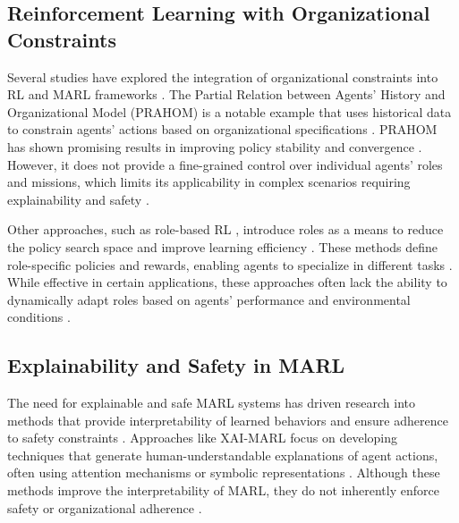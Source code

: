 \documentclass[sigconf,anonymous]{aamas}
\begin{document}
\subsection{Reinforcement Learning with Organizational Constraints}
Several studies have explored the integration of organizational constraints into RL and MARL frameworks \cite{hernandez2019survey}. The Partial Relation between Agents' History and Organizational Model (PRAHOM) \cite{prahom_reference} is a notable example that uses historical data to constrain agents' actions based on organizational specifications \cite{hubner2010moise}. PRAHOM has shown promising results in improving policy stability and convergence \cite{hernandez2019survey}. However, it does not provide a fine-grained control over individual agents' roles and missions, which limits its applicability in complex scenarios requiring explainability and safety \cite{ghosal2021explainable}.


Other approaches, such as role-based RL \cite{role_based_rl_reference}, introduce roles as a means to reduce the policy search space and improve learning efficiency \cite{foerster2018counterfactual}. These methods define role-specific policies and rewards, enabling agents to specialize in different tasks \cite{hernandez2019survey}. While effective in certain applications, these approaches often lack the ability to dynamically adapt roles based on agents' performance and environmental conditions \cite{hubner2010moise, soule2024}.


\subsection{Explainability and Safety in MARL}
The need for explainable and safe MARL systems has driven research into methods that provide interpretability of learned behaviors and ensure adherence to safety constraints \cite{bastani2018verifiable, ghosal2021explainable}. Approaches like XAI-MARL \cite{xai_marl_reference} focus on developing techniques that generate human-understandable explanations of agent actions, often using attention mechanisms or symbolic representations \cite{ghosal2021explainable, su2021toward}. Although these methods improve the interpretability of MARL, they do not inherently enforce safety or organizational adherence \cite{bastani2018verifiable}.
\end{document}
